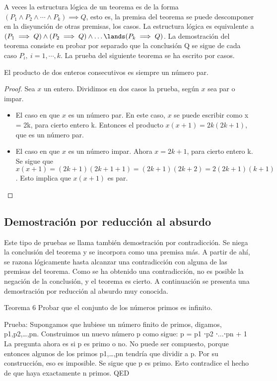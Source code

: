 A veces la estructura lógica de un teorema es de la forma $(P_1 \land P_2 \land \cdots \land P_k) \implies Q$, esto es, la premisa del teorema se puede descomponer en la disyunción de otras premisas, los casos.
La estructura lógica es equivalente a $(P_1 \implies Q) \land (P_2 \implies Q) \land \ldots \lands (P_k\implies Q)$.
La demostración del teorema consiste en probar por separado que la conclusión Q se sigue de cada caso $P_i,\ i = 1, \cdots,k$.
La prueba del siguiente teorema se ha escrito por casos.
\begin{theorem}
    El producto de dos enteros consecutivos es siempre un número par.
\end{theorem}
\begin{proof}
    Sea $x$ un entero.
    Dividimos en dos casos la prueba, según $x$ sea par o impar.
    \begin{itemize}
        \item El caso en que $x$ es un número par.
        En este caso, $x$ se puede escribir como x = 2k, para cierto entero k.
        Entonces el producto $x(x + 1) = 2k(2k + 1)$, que es un número par.

        \item El caso en que $x$ es un número impar.
        Ahora $x = 2k + 1$, para cierto entero k.
        Se sigue que $x(x + 1) = (2k + 1)(2k + 1 + 1) = (2k + 1)(2k + 2) = 2(2k + 1)(k + 1)$.
        Esto implica que $x(x + 1)$ es par.
    \end{itemize}
\end{proof}



\subsection{Demostración por reducción al absurdo}

Este tipo de pruebas se llama también demostración por contradicción. Se niega la conclusión del teorema y se incorpora como una premisa más. A partir de ahí, se razona lógicamente hasta alcanzar una contradicción con alguna de las premisas del teorema. Como se ha obtenido una contradicción, no es posible la negación de la conclusión, y el teorema es cierto. A continuación se presenta una demostración por reducción al absurdo muy conocida.

Teorema 6 Probar que el conjunto de los números primos es infinito.

Prueba: Supongamos que hubiese un número finito de primos, digamos, {p1,p2,…,pn}. Construimos un nuevo número p como sigue:
p = p1 ⋅p2 ⋅...⋅pn + 1
La pregunta ahora es si p es primo o no. No puede ser compuesto, porque entonces algunos de los primos p1,…,pn tendría que dividir a p. Por su construcción, eso es imposible. Se sigue que p es primo. Esto contradice el hecho de que haya exactamente n primos. QED



